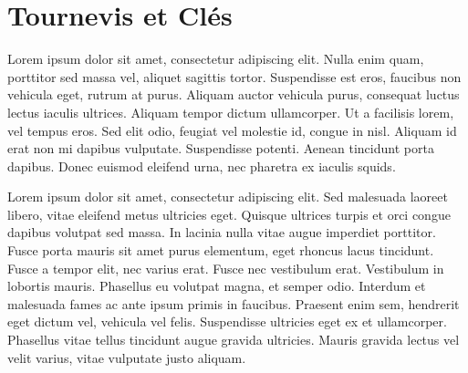 \section{Tournevis et Clés}
Lorem ipsum dolor sit amet, consectetur adipiscing elit. Nulla enim quam, porttitor sed massa vel, aliquet sagittis tortor. Suspendisse est eros, faucibus non vehicula eget, rutrum at purus. Aliquam auctor vehicula purus, consequat luctus lectus iaculis ultrices. Aliquam tempor dictum ullamcorper. Ut a facilisis lorem, vel tempus eros. Sed elit odio, feugiat vel molestie id, congue in nisl. Aliquam id erat non mi dapibus vulputate. Suspendisse potenti. Aenean tincidunt porta dapibus. Donec euismod eleifend urna, nec pharetra ex iaculis squids.

Lorem ipsum dolor sit amet, consectetur adipiscing elit. Sed malesuada laoreet libero, vitae eleifend metus ultricies eget. Quisque ultrices turpis et orci congue dapibus volutpat sed massa. In lacinia nulla vitae augue imperdiet porttitor. Fusce porta mauris sit amet purus elementum, eget rhoncus lacus tincidunt. Fusce a tempor elit, nec varius erat. Fusce nec vestibulum erat. Vestibulum in lobortis mauris. Phasellus eu volutpat magna, et semper odio. Interdum et malesuada fames ac ante ipsum primis in faucibus. Praesent enim sem, hendrerit eget dictum vel, vehicula vel felis. Suspendisse ultricies eget ex et ullamcorper. Phasellus vitae tellus tincidunt augue gravida ultricies. Mauris gravida lectus vel velit varius, vitae vulputate justo aliquam.
